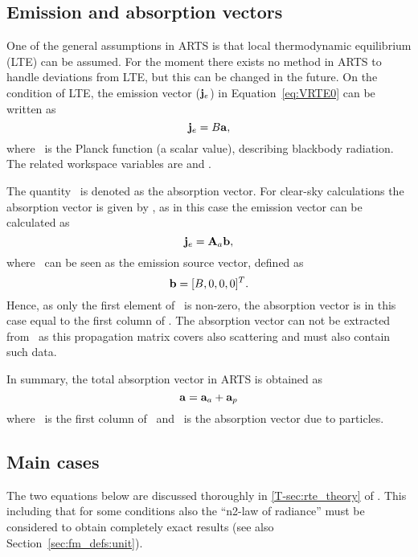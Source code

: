 \subsection{Emission and absorption vectors}
\label{sec:rteq:evec}

One of the general assumptions in ARTS is that local thermodynamic equilibrium
(LTE) can be assumed. For the moment there exists no method in ARTS to handle
deviations from LTE, but this can be changed in the future.
On the condition of LTE, the emission vector ($\mathbf{j}_e$) in
Equation~\ref{eq:VRTE0} can be written as
\begin{equation}
  \label{eq:evec1}
  {\bf j}_{e} = B {\bf a},
\end{equation}
where \Planck\ is the Planck function (a scalar value), describing blackbody
radiation. The related workspace variables are 
and . 

The quantity \AbsVec\ is denoted as the absorption vector. For clear-sky
calculations the absorption vector is given by , as in this case the
emission vector can be calculated as
\begin{equation}
  \label{eq:evec2}
  {\bf j}_{e} = {\bf A}_{a}{\bf b},
\end{equation}
where \EmsVec\ can be seen as the emission source vector, defined as
\begin{equation}
  {\bf b} = [B,0,0,0]^T.
\end{equation}
Hence, as only the first element of \EmsVec\ is non-zero, the absorption
vector is in this case equal to the first column of .
The absorption vector can not be extracted from \ as this
propagation matrix covers also scattering and 
must also contain such data.

In summary, the total absorption vector in ARTS is obtained as
\begin{equation}
  \label{eq:evec3}
  {\bf a} = {\bf a}_{a} + {\bf a}_{p}
\end{equation}
where \ is the first column of \, and \ is the
absorption vector due to particles.




\subsection{Main cases}
\label{sec:rteq:cases}
%
The two equations below are discussed thoroughly in \ref{T-sec:rte_theory} of
\theory. This including that for some conditions also the ``n2-law of
radiance'' must be considered to obtain completely exact results (see also
Section~\ref{sec:fm_defs:unit}).


